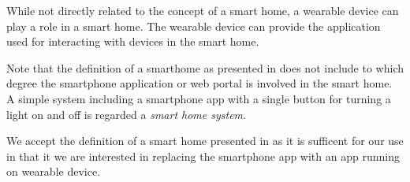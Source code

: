 While not directly related to the concept of a smart home, a wearable device can play a role in a smart home. The wearable device can provide the application used for interacting with devices in the smart home.

Note that the definition of a smarthome as presented in \cite{SMARTHOMETREND} does not include to which degree the smartphone application or web portal is involved in the smart home. A simple system including a smartphone app with a single button for turning a light on and off is regarded a \emph{smart home system}.

We accept the definition of a smart home presented in \cite{SMARTHOMETREND} as it is sufficent for our use in that it we are interested in replacing the smartphone app with an app running on wearable device.

